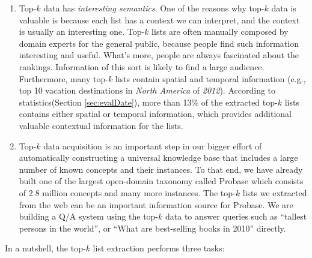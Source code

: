 \begin{enumerate}
\item Top-$k$ data has {\it interesting semantics}.  One of the reasons why
  top-$k$ data is valuable is because each list has a context we can
  interpret, and the context is usually an interesting one.  Top-$k$
  lists are often manually composed by domain experts for the general
  public, because people find such information interesting and useful.
  What's more, people are always fascinated about the rankings.  
  Information of this sort is likely to find a large
  audience. Furthermore, many top-$k$ lists contain spatial and
  temporal information (e.g., top 10 vacation destinations in {\it
    North America} of {\it 2012}). 
  According to statistics(Section \ref{sec:evalDate}),
  more than 13\% of the extracted top-$k$ lists contains
  either spatial or temporal information, which provides additional
  valuable contextual information for the lists.

\item Top-$k$ data acquisition is an important step in our bigger
  effort of automatically constructing a universal knowledge base that
  includes a large number of known concepts and their instances.  To
  that end, we have already built one of the largest open-domain
  taxonomy called Probase \cite{WuLWZ12:Probase} which consists of 2.8
  million concepts and many more instances.  The top-$k$ lists we
  extracted from the web can be an important information source for
  Probase.  We are building a Q/A system using the top-$k$ data
  to %
  answer queries such as ``tallest persons in the world'', or ``What
  are best-selling books in 2010'' directly.
\end{enumerate}


In a nutshell, the top-$k$ list extraction
performs three tasks: %

